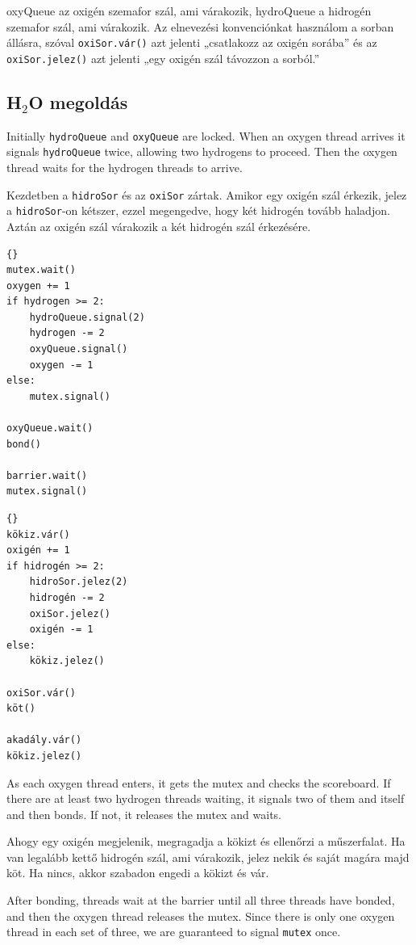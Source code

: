 \documentclass{book}
\newcommand{\clearemptydoublepage}{\newpage\cleardoublepage}
\begin{document}
oxyQueue az oxigén szemafor szál, ami várakozik, hydroQueue
a hidrogén szemafor szál, ami várakozik. Az elnevezési konvenciónkat
használom a sorban állásra, szóval {\tt oxiSor.vár()} azt jelenti
„csatlakozz az oxigén sorába” és az {\tt oxiSor.jelez()} azt
jelenti „egy oxigén szál távozzon a sorból.”

\clearemptydoublepage
\subsection{H$_2$O megoldás}

Initially {\tt hydroQueue} and {\tt oxyQueue} are locked.  When
an oxygen thread arrives it signals {\tt hydroQueue} twice,
allowing two hydrogens to proceed.  Then the oxygen thread waits
for the hydrogen threads to arrive.

Kezdetben a {\tt hidroSor} és az {\tt oxiSor} zártak. Amikor egy
oxigén szál érkezik, jelez a {\tt hidroSor}-on
kétszer, ezzel megengedve, hogy két hidrogén tovább haladjon.
Aztán az oxigén szál várakozik a két hidrogén szál érkezésére.

\begin{lstlisting}[title={Oxygen code}]{}
mutex.wait()
oxygen += 1
if hydrogen >= 2:
    hydroQueue.signal(2)
    hydrogen -= 2
    oxyQueue.signal()
    oxygen -= 1
else:
    mutex.signal()

oxyQueue.wait()
bond()

barrier.wait()
mutex.signal()
\end{lstlisting}

\begin{lstlisting}[title={Oxigén kód}]{}
kökiz.vár()
oxigén += 1
if hidrogén >= 2:
    hidroSor.jelez(2)
    hidrogén -= 2
    oxiSor.jelez()
    oxigén -= 1
else:
    kökiz.jelez()

oxiSor.vár()
köt()

akadály.vár()
kökiz.jelez()
\end{lstlisting}
As each oxygen thread enters, it gets the mutex and checks the scoreboard.
If there are at least two hydrogen threads waiting, it signals two of
them and itself and then bonds.  If not, it releases the mutex and
waits.

Ahogy egy oxigén megjelenik, megragadja a kökizt és ellenőrzi a
műszerfalat. Ha van legalább kettő hidrogén szál, ami várakozik,
jelez nekik és saját magára majd köt. Ha nincs,
akkor szabadon engedi a kökizt és vár.

After bonding, threads wait at the barrier until all three threads
have bonded, and then the oxygen thread releases the mutex.  Since
there is only one oxygen thread in each set of three, we are guaranteed
to signal {\tt mutex} once.
\end{document}
